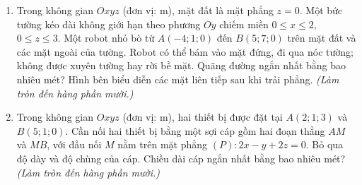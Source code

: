 \documentclass[12pt,a4paper]{article}
\begin{document}
\begin{enumerate}
\item \begin{minipage}[t]{0.55\linewidth}
Trong không gian $Oxyz$ (đơn vị: m), mặt đất là mặt phẳng $z=0$. Một bức tường kéo dài không giới hạn theo phương $Oy$ chiếm miền $0\leq x\leq2$, $0\leq z\leq3$. Một robot nhỏ bò từ $A(-4;1;0)$ đến $B(5;7;0)$ trên mặt đất và các mặt ngoài của tường. Robot có thể bám vào mặt đứng, đi qua nóc tường; không được xuyên tường hay rời bề mặt. Quãng đường ngắn nhất bằng bao nhiêu mét? Hình bên biểu diễn các mặt liên tiếp sau khi trải phẳng. \textit{(Làm tròn đến hàng phần mười.)}
\end{minipage}\hfill
\begin{minipage}[t]{0.42\linewidth}
\vspace{-0.4\baselineskip}\centering
{}
\end{minipage}

\item Trong không gian $Oxyz$ (đơn vị: m), hai thiết bị được đặt tại $A(2;1;3)$ và $B(5;1;0)$. Cần nối hai thiết bị bằng một sợi cáp gồm hai đoạn thẳng $AM$ và $MB$, với đầu nối $M$ nằm trên mặt phẳng $(P):2x-y+2z=0$. Bỏ qua độ dày và độ chùng của cáp. Chiều dài cáp ngắn nhất bằng bao nhiêu mét? \textit{(Làm tròn đến hàng phần mười.)}


\end{enumerate}
\end{document}
